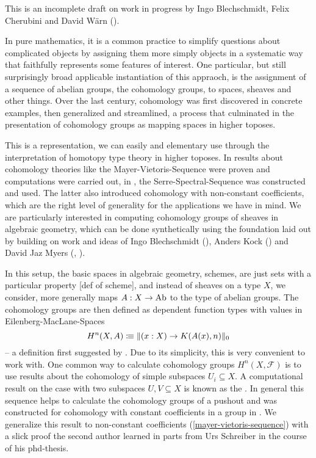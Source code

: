 This is an incomplete draft on work in progress by Ingo Blechschmidt, Felix Cherubini and David Wärn (\cite{chech-draft}).

In pure mathematics,
it is a common practice to simplify questions about complicated objects
by assigning them more simply objects in a systematic way that faithfully represents some features of interest.
One particular, but still surprisingly broad applicable instantiation of this appraoch,
is the assignment of a sequence of abelian groups, the cohomology groups, to spaces, sheaves and other things.
Over the last century, cohomology was first discovered in concrete examples, then generalized and streamlined,
a process that culminated in the presentation of cohomology groups as mapping spaces in higher toposes.

This is a representation, we can easily and elementary use through the interpretation of homotopy type theory in higher toposes.
In \cite{evan-master-thesis} results about cohomology theories like the Mayer-Vietoris-Sequence were proven and computations were carried out,
in \cite{floris-thesis}, the Serre-Spectral-Sequence was constructed and used.
The latter also introduced cohomology with non-constant coefficients,
which are the right level of generality for the applications we have in mind.
We are particularly interested in computing cohomology groups of sheaves in algebraic geometry,
which can be done synthetically using the foundation laid out by \cite{draft}
building on work and ideas of Ingo Blechschmidt (\cite{ingo-thesis}), Anders Kock (\cite{kock-sdg})
and David Jaz Myers (\cite{myers-talk1}, \cite{myers-talk2}).

In this setup, the basic spaces in algebraic geometry, schemes, are just sets with a particular property \cite{draft}[def of scheme],
and instead of sheaves on a type $X$, we consider, more generally maps $A:X\to\operatorname{Ab}$ to the type of abelian groups.
The cohomology groups are then defined as dependent function types with values in Eilenberg-MacLane-Spaces
\[ H^n(X,A)\vcentcolon\mspace{-1.2mu}\equiv \|(x:X)\to K(A(x),n)\|_0\]
-- a definition first suggested by \cite{mike-blogpost}.
Due to its simplicity, this is very convenient to work with.
One common way to calculate cohomology groups $H^n(X,\mathcal F)$ is to
use results about the cohomology of simple subspaces $U_i\subseteq X$.
A computational result on the case with two subspaces $U,V\subseteq X$ is known as the .
In general this sequence helps to calculate the cohomology groups of a pushout
and was constructed for cohomology with constant coefficients in a group in \cite{evan-master-thesis}.
We generalize this result to non-constant coefficients (\cref{mayer-vietoris-sequence})
with a slick proof the second author learned in parts from Urs Schreiber in the course of his phd-thesis.

